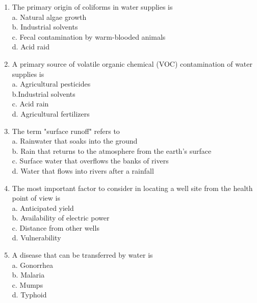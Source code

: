 \documentclass{article}
\begin{document}
\begin{enumerate}
  \item The primary origin of coliforms in water supplies is\\
a. Natural algae growth\\
b. Industrial solvents\\
c. Fecal contamination by warm-blooded animals\\
d. Acid raid\\

\item A primary source of volatile organic chemical (VOC) contamination of water supplies is\\
a. Agricultural pesticides\\

b.Industrial solvents\\

c. Acid rain\\

d. Agricultural fertilizers\\

\item The term "surface runoff" refers to\\

a. Rainwater that soaks into the ground\\

b. Rain that returns to the atmosphere from the earth's surface\\

c. Surface water that overflows the banks of rivers\\

d. Water that flows into rivers after a rainfall\\

\item The most important factor to consider in locating a well site from the health point of view is\\
a. Anticipated yield\\
b. Availability of electric power\\
c. Distance from other wells\\
d.  Vulnerability\\

  \item A disease that can be transferred by water is\\
a. Gonorrhea\\
b. Malaria\\
c. Mumps\\
d. Typhoid\\


\end{enumerate}
\end{document}
